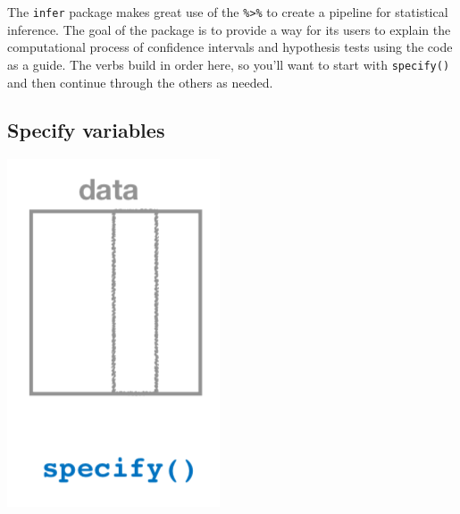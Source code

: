 \documentclass[12pt, krantz2,]{krantz}
\begin{document}
The \texttt{infer} package makes great use of the \texttt{\%\textgreater{}\%} to create a pipeline for statistical inference. The goal of the package is to provide a way for its users to explain the computational process of confidence intervals and hypothesis tests using the code as a guide. The verbs build in order here, so you'll want to start with \texttt{specify()} and then continue through the others as needed.

\hypertarget{specify-variables}{%
\subsection{Specify variables}\label{specify-variables}}

\begin{center}\includegraphics[width=\textwidth]{images/flowcharts/infer/specify} \end{center}
\end{document}
